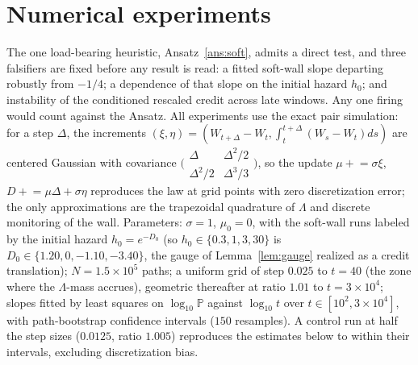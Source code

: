 \documentclass[11pt]{article}
\theoremstyle{definition}
\theoremstyle{remark}
\newcommand{\PP}{\mathbb{P}}
\begin{document}
\section{Numerical experiments}\label{sec:numerics}

The one load-bearing heuristic, Ansatz~\ref{ans:soft}, admits a direct
test, and three falsifiers are fixed before any result is read: a
fitted soft-wall slope departing robustly from $-1/4$; a dependence of
that slope on the initial hazard $h_0$; and instability of the
conditioned rescaled credit across late windows. Any one firing would
count against the Ansatz. All experiments use the exact
pair simulation: for a step $\Delta$, the increments
$(\xi,\eta)=(W_{t+\Delta}-W_t,\int_t^{t+\Delta}(W_s-W_t)ds)$ are
centered Gaussian with covariance
$\bigl(\begin{smallmatrix}\Delta&\Delta^2/2\\
\Delta^2/2&\Delta^3/3\end{smallmatrix}\bigr)$, so the update
$\mu\mathrel{+}=\sigma\xi$, $D\mathrel{+}=\mu\Delta+\sigma\eta$
reproduces the law at grid points with zero discretization error; the
only approximations are the trapezoidal quadrature of $\Lambda$ and
discrete monitoring of the wall. Parameters: $\sigma=1$,
$\mu_0=0$, with the soft-wall runs labeled by the initial hazard
$h_0=e^{-D_0}$ (so $h_0\in\{0.3,1,3,30\}$ is $D_0\in\{1.20,0,-1.10,-3.40\}$,
the gauge of Lemma~\ref{lem:gauge} realized as a credit translation);
$N=1.5\times10^5$ paths; a uniform grid of step
$0.025$ to $t=40$ (the zone where the $\Lambda$-mass accrues),
geometric thereafter at ratio $1.01$ to $t=3\times10^4$; slopes fitted
by least squares on $\log_{10}\PP$ against $\log_{10}t$ over
$t\in[10^2,3\times10^4]$, with path-bootstrap confidence intervals
($150$ resamples). A control run at half the step sizes
($0.0125$, ratio $1.005$) reproduces the estimates below to within
their intervals, excluding discretization bias.
\end{document}
